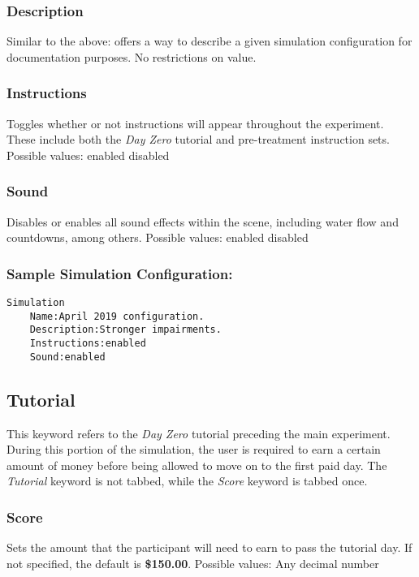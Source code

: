 \documentclass{article}
\begin{document}
\subsubsection*{Description} Similar to the above: offers a way to describe a given simulation configuration for documentation purposes. No restrictions on value. 
\pagebreak\subsubsection*{Instructions} Toggles whether or not instructions will appear throughout the experiment. These include both the \textit{Day Zero} tutorial and pre-treatment instruction sets.
\newline \indent Possible values: \newline
\indent\indent enabled \newline
\indent\indent disabled

\subsubsection*{Sound} Disables or enables all sound effects within the scene, including water flow and countdowns, among others.
\newline \indent Possible values: \newline
\indent\indent enabled \newline
\indent\indent disabled

\subsubsection*{Sample Simulation Configuration:}
\begin{lstlisting}
Simulation
    Name:April 2019 configuration.
    Description:Stronger impairments.
    Instructions:enabled
    Sound:enabled
\end{lstlisting} 

\subsection*{Tutorial}
This keyword refers to the \textit{Day Zero} tutorial preceding the main experiment. During this portion of the simulation, the user is required to earn a certain amount of money before being allowed to move on to the first paid day. The \textit{Tutorial} keyword is not tabbed, while the \textit{Score} keyword is tabbed once.

\subsubsection*{Score} Sets the amount that the participant will need to earn to pass the tutorial day. If not specified, the default is \textbf{\$150.00}. \newline
\indent Possible values: \newline
\indent\indent Any decimal number
\end{document}
